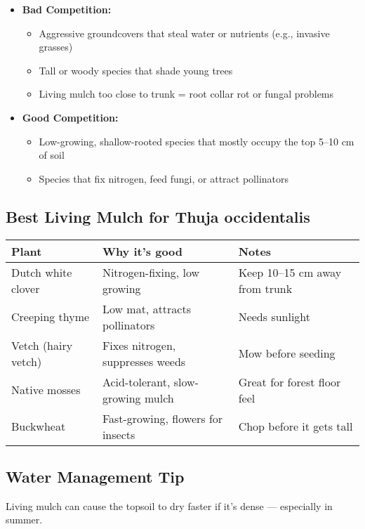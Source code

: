 \documentclass{article}
\begin{document}
\begin{itemize}
    \item \textbf{Bad Competition:}
    \begin{itemize}
        \item Aggressive groundcovers that steal water or nutrients (e.g., invasive grasses)
        \item Tall or woody species that shade young trees
        \item Living mulch too close to trunk = root collar rot or fungal problems
    \end{itemize}
    \item \textbf{Good Competition:}
    \begin{itemize}
        \item Low-growing, shallow-rooted species that mostly occupy the top 5–10 cm of soil
        \item Species that fix nitrogen, feed fungi, or attract pollinators
    \end{itemize}
\end{itemize}

\subsection*{Best Living Mulch for Thuja occidentalis}

\begin{tabular}{|l|l|l|}
\hline
\textbf{Plant} & \textbf{Why it's good} & \textbf{Notes} \\ \hline
Dutch white clover & Nitrogen-fixing, low growing & Keep 10–15 cm away from trunk \\ \hline
Creeping thyme & Low mat, attracts pollinators & Needs sunlight \\ \hline
Vetch (hairy vetch) & Fixes nitrogen, suppresses weeds & Mow before seeding \\ \hline
Native mosses & Acid-tolerant, slow-growing mulch & Great for forest floor feel \\ \hline
Buckwheat & Fast-growing, flowers for insects & Chop before it gets tall \\ \hline
\end{tabular}

\subsection*{Water Management Tip}
Living mulch can cause the topsoil to dry faster if it’s dense — especially in summer.
\end{document}
